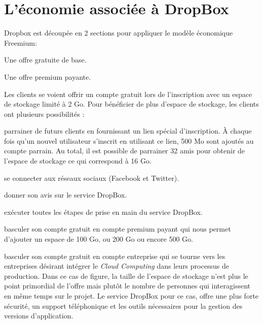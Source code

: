 \documentclass[a4paper, 10pt]{article}
\begin{document}
\section*{L'\'economie associ\'ee \`a DropBox}
Dropbox est d\'ecoup\'ee en 2 sections pour appliquer le mod\`ele \'economique Freemium:
\begin{itemize*}
 \item Une offre gratuite de base.
 \item Une offre premium payante.
\end{itemize*}
Les clients se voient offrir un compte gratuit lors de l'inscription avec un espace de stockage limit\'e \`a 2 Go.
Pour b\'en\'eficier de plus d'espace de stockage, les clients ont plusieurs possibilit\'es :
\begin{itemize*}
 \item parrainer de futurs clients en fournissant un lien sp\'ecial d'inscription.
\`A chaque fois qu'un nouvel utilisateur s'inscrit en utilisant ce lien, 500 Mo sont ajout\'es au compte parrain.
Au total, il est possible de parrainer 32 amis pour obtenir de l'espace de stockage ce qui correspond \`a 16 Go.
 \item se connecter aux r\'eseaux sociaux (Facebook et Twitter).
 \item donner son avis sur le service DropBox.
 \item ex\'ecuter toutes les \'etapes de prise en main du service DropBox.
 \item basculer son compte gratuit en compte premium payant qui nous permet d'ajouter un espace de 100 Go, ou 200 Go ou encore 500 Go.
 \item basculer son compte gratuit en compte entreprise qui se tourne vers les entreprises d\'esirant int\'egrer le \textit{Cloud Computing}
dans leurs processus de production. Dans ce cas de figure, la taille de l'espace de stockage n'est plus le point primordial de l'offre mais
plut\^ot le nombre de personnes qui interagissent en m\^eme temps sur le projet. Le service DropBox pour ce cas, offre une plus forte s\'ecurit\'e,
un support t\'el\'ephonique et les outils n\'ecessaires pour la gestion des versions d'application.
\end{itemize*}
\end{document}
